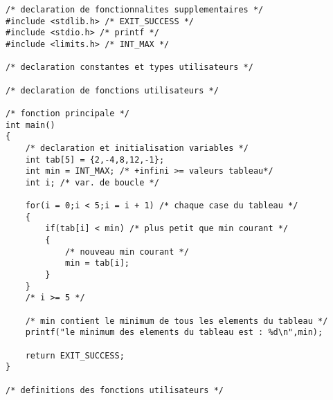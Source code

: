 \begin{correction}
\begin{verbatim}
/* declaration de fonctionnalites supplementaires */
#include <stdlib.h> /* EXIT_SUCCESS */
#include <stdio.h> /* printf */
#include <limits.h> /* INT_MAX */

/* declaration constantes et types utilisateurs */

/* declaration de fonctions utilisateurs */

/* fonction principale */
int main()
{
    /* declaration et initialisation variables */
    int tab[5] = {2,-4,8,12,-1};
    int min = INT_MAX; /* +infini >= valeurs tableau*/
    int i; /* var. de boucle */

    for(i = 0;i < 5;i = i + 1) /* chaque case du tableau */
    {
        if(tab[i] < min) /* plus petit que min courant */
        {
            /* nouveau min courant */
            min = tab[i];
        }
    }
    /* i >= 5 */
    
    /* min contient le minimum de tous les elements du tableau */
    printf("le minimum des elements du tableau est : %d\n",min);

    return EXIT_SUCCESS;
}

/* definitions des fonctions utilisateurs */
\end{verbatim}
\end{correction}

